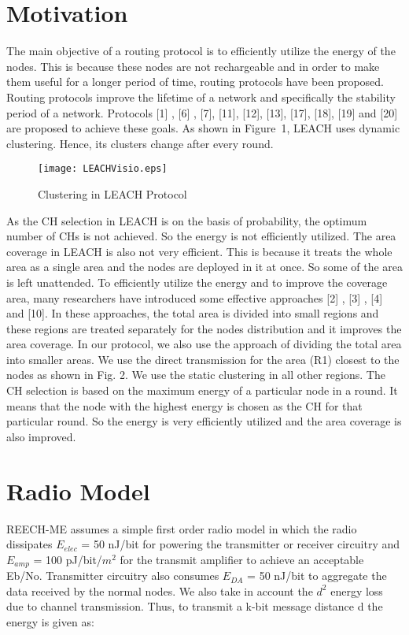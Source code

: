 \documentclass[journal]{IEEEtran}
\begin{document}
\section{Motivation}
The main objective of a routing protocol is to efficiently utilize the energy of the nodes. This is because these nodes are not rechargeable and in order to make them useful for a longer period of time, routing protocols have been proposed. Routing protocols improve the lifetime of a network and specifically the stability period of a network. Protocols [1] , [6] , [7], [11], [12], [13], [17], [18], [19] and [20] are proposed to achieve these goals. As shown in Figure~1, LEACH uses dynamic clustering. Hence, its clusters change after every round.


\begin{figure}[!h]
\centering
\texttt{[image: LEACHVisio.eps]}
\caption{Clustering in LEACH Protocol}
\end{figure}

As the CH selection in LEACH is on the basis of probability, the optimum number of CHs is not achieved. So the energy is not efficiently utilized. The area coverage in LEACH is also not very efficient. This is because it treats the whole area as a single area and the nodes are deployed in it at once. So some of the area is left unattended. To efficiently utilize the energy and to improve the coverage area, many researchers have introduced some effective approaches [2] , [3] , [4] and [10]. In these approaches, the total area is divided into small regions and these regions are treated separately for the nodes distribution and it improves the area coverage. In our protocol, we also use the approach of dividing the total area into smaller areas. We use the direct transmission for the area (R1) closest to the nodes as shown in Fig. 2. We use the static clustering in all other regions. The CH selection is based on the maximum energy of a particular node in a round. It means that the node with the highest energy is chosen as the CH for that particular round. So the energy is very efficiently utilized and the area coverage is also improved.

\section{Radio Model}
  REECH-ME assumes a simple first order radio model in which the radio dissipates $E_{elec}$ = 50 nJ/bit for powering the transmitter or receiver circuitry and $E_{amp}$ = 100 pJ/bit/$m^2$ for the transmit amplifier to achieve an acceptable Eb/No. Transmitter circuitry also consumes $E_{DA}$ = 50 nJ/bit to aggregate the data received by the normal nodes. We also take in account the $d^2$ energy loss due to channel transmission. Thus, to transmit a k-bit message distance d the energy is given as:
\end{document}
